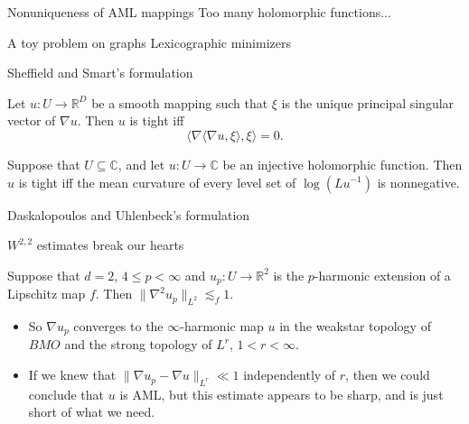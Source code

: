 \documentclass[10pt]{beamer}
\newcommand{\RR}{\mathbb{R}}
\newcommand{\CC}{\mathbb{C}}
\begin{document}
\begin{frame}{Nonuniqueness of AML mappings}
    Too many holomorphic functions...
\end{frame}

\begin{frame}{A toy problem on graphs}
    Lexicographic minimizers
\end{frame}

\begin{frame}{Sheffield and Smart's formulation}
\begin{theorem}
Let $u: U \to \RR^D$ be a smooth mapping such that $\xi$ is the unique principal singular vector of $\nabla u$.
Then $u$ is tight iff 
$$\langle \nabla \langle \nabla u, \xi\rangle, \xi\rangle = 0.$$
\end{theorem}

\begin{theorem}
Suppose that $U \subseteq \CC$, and let $u: U \to \CC$ be an injective holomorphic function.
Then $u$ is tight iff the mean curvature of every level set of $\log(Lu^{-1})$ is nonnegative.
\end{theorem}
    
\end{frame}

\begin{frame}{Daskalopoulos and Uhlenbeck's formulation}
    
\end{frame}

\begin{frame}{$W^{2, 2}$ estimates break our hearts}
\begin{theorem} 
Suppose that $d = 2$, $4 \leq p < \infty$ and $u_p: U \to \RR^2$ is the $p$-harmonic extension of a Lipschitz map $f$.
Then $\|\nabla^2 u_p\|_{L^2} \lesssim_f 1$.
\end{theorem}
 
\begin{itemize}
\item So $\nabla u_p$ converges to the $\infty$-harmonic map $u$ in the weakstar topology of $BMO$ and the strong topology of $L^r$, $1 < r < \infty$.  
\item If we knew that $\|\nabla u_p - \nabla u\|_{L^r} \ll 1$ independently of $r$, then we could conclude that $u$ is AML, but this estimate appears to be sharp, and is just short of what we need.
\end{itemize}

\end{frame}
\end{document}
